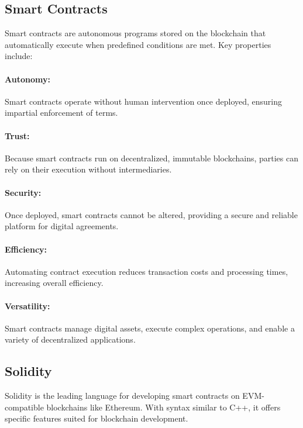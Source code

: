 \subsection{Smart Contracts}
\label{subsec:smart_contracts}

Smart contracts are autonomous programs stored on the blockchain that
automatically execute when predefined conditions are met. Key properties
include:

\paragraph{Autonomy:}
Smart contracts operate without human intervention once deployed, ensuring
impartial enforcement of terms.

\paragraph{Trust:}
Because smart contracts run on decentralized, immutable blockchains, parties
can rely on their execution without intermediaries.

\paragraph{Security:}
Once deployed, smart contracts cannot be altered, providing a secure and
reliable platform for digital agreements.

\paragraph{Efficiency:}
Automating contract execution reduces transaction costs and processing times,
increasing overall efficiency.

\paragraph{Versatility:}
Smart contracts manage digital assets, execute complex operations, and enable a
variety of decentralized applications.

\subsection{Solidity}
\label{subsec:solidity}

Solidity is the leading language for developing smart contracts on
EVM-compatible blockchains like Ethereum. With syntax similar to C++, it offers
specific features suited for blockchain development.

